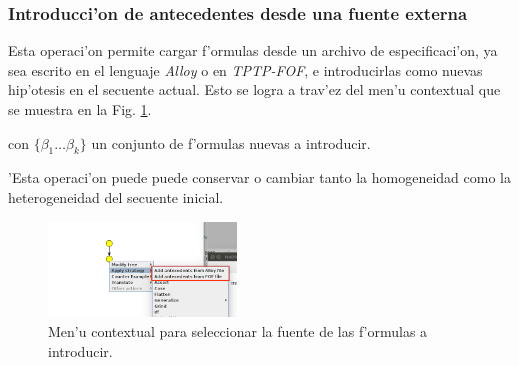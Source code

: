 \subsubsection{Introducci'on de antecedentes desde una fuente externa}

Esta operaci'on permite cargar f'ormulas desde un archivo de especificaci'on, ya sea escrito en el lenguaje \textit{Alloy} o en \textit{TPTP-FOF}, e introducirlas como nuevas hip'otesis en el secuente actual. Esto se logra a trav'ez del men'u contextual que se muestra en la Fig. \ref{add antecedents 1}.


\begin{prooftree}
\end{prooftree}

con $\{\beta_1 \ldots \beta_k\}$ un conjunto de f'ormulas nuevas a introducir.


'Esta operaci'on puede puede conservar o cambiar tanto la homogeneidad como la heterogeneidad del secuente inicial.

\begin{figure}
\centering
\includegraphics[width=5cm]{img/add_antecedents_1.png}	
\caption{Men'u contextual para seleccionar la fuente de las f'ormulas a introducir.}
\label{add antecedents 1}
\end{figure}


